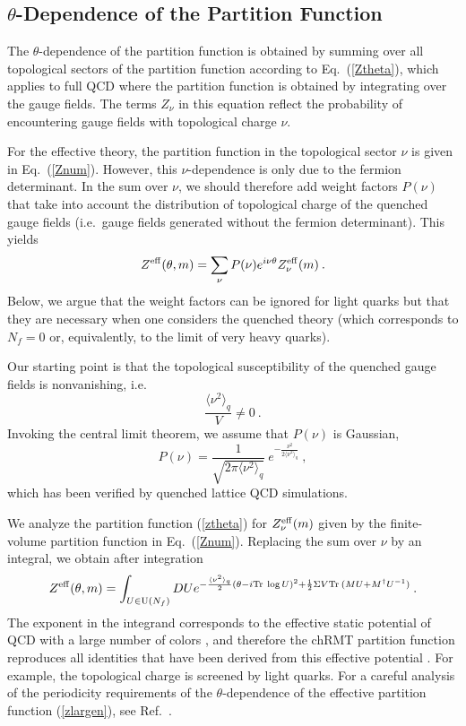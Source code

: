 \subsection{$\theta$-Dependence of the Partition Function}

The $\theta$-dependence of the partition function is obtained by
summing over all topological sectors of the partition function
according to Eq.~(\ref{Ztheta}), which applies to full QCD where the
partition function is obtained by integrating over the gauge fields.
The terms $Z_\nu$ in this equation reflect the probability of
encountering gauge fields with topological charge $\nu$.

For the effective theory, the partition function in the topological
sector $\nu$ is given in Eq.~(\ref{Znum}).  However,
this $\nu$-dependence is only due to the fermion
determinant.  In the sum over $\nu$, we should therefore add weight
factors $P(\nu)$ that take into account the distribution of
topological charge of the quenched gauge fields (i.e.\ gauge fields
generated without the fermion determinant).  This yields
\begin{equation}
  Z^{\rm eff}(\theta,m) = \sum_{\nu}P(\nu) e^{i\nu \theta} Z^{\rm
  eff}_\nu(m)\:. 
\label{ztheta}
\end{equation}
Below, we argue that the weight factors can be ignored for light
quarks but that they are necessary when one considers the quenched
theory (which corresponds to $N_f=0$ or, equivalently, to the limit of
very heavy quarks).

Our starting point is that the topological susceptibility of the
quenched gauge fields is nonvanishing, i.e.
\begin{equation}
  \frac { \langle \nu^2 \rangle_q} V \ne 0\:.
\end{equation}
Invoking the central limit theorem, we assume that $P(\nu)$ is Gaussian,
\begin{equation}
  P(\nu) = \frac 1{\sqrt{2 \pi \langle \nu^2 \rangle_q}}\:
  e^{-\frac{\nu^2}{2 \langle \nu^2 \rangle_q }}\:,
\end{equation}
which has been verified by quenched lattice QCD simulations.

We analyze the partition function (\ref{ztheta}) for
$Z_{\nu}^{\rm eff}(m)$ given by the finite-volume partition function
in Eq.~(\ref{Znum}).  Replacing the sum over $\nu$ by an integral, we
obtain after integration
\begin{equation}
  Z^{\rm eff}(\theta,m)=\int_{U\in{\rm U}(N_f)} DU
  e^{-\frac{ \langle \nu^2 \rangle_q}2
    (\theta -i{\rm Tr\:}\log U )^2 +  \frac12\Sigma V {\rm Tr\:} (MU + M^\dagger
     U^{-1})}\:. 
\label{zlargen}
\end{equation}
The exponent in the integrand corresponds to the effective static
potential of QCD with a large number of colors \cite{Witten}, and
therefore the chRMT partition function reproduces all identities that
have been derived from this effective potential \cite{Shur93,janu1}.
For example, the topological charge is screened by light quarks. For a
careful analysis of the periodicity requirements of the
$\theta$-dependence of the effective partition function
(\ref{zlargen}), see Ref.~\cite{Zhit}.

